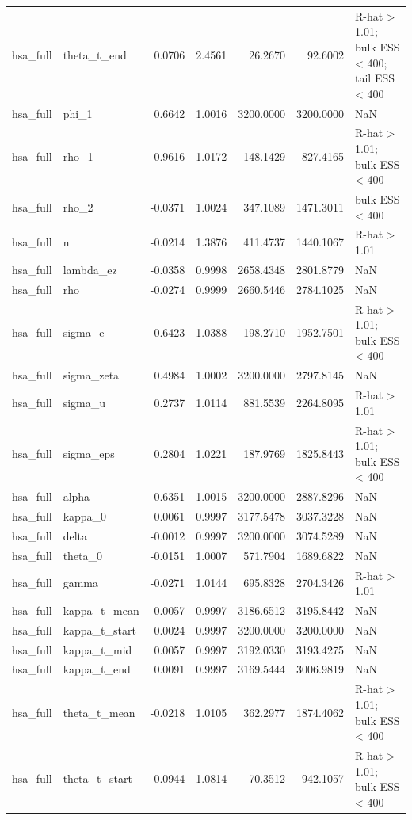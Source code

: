 \begin{tabular}{llrrrrl}
hsa\_full & theta\_t\_end & 0.0706 & 2.4561 & 26.2670 & 92.6002 & R-hat > 1.01; bulk ESS < 400; tail ESS < 400 \\
hsa\_full & phi\_1 & 0.6642 & 1.0016 & 3200.0000 & 3200.0000 & NaN \\
hsa\_full & rho\_1 & 0.9616 & 1.0172 & 148.1429 & 827.4165 & R-hat > 1.01; bulk ESS < 400 \\
hsa\_full & rho\_2 & -0.0371 & 1.0024 & 347.1089 & 1471.3011 & bulk ESS < 400 \\
hsa\_full & n & -0.0214 & 1.3876 & 411.4737 & 1440.1067 & R-hat > 1.01 \\
hsa\_full & lambda\_ez & -0.0358 & 0.9998 & 2658.4348 & 2801.8779 & NaN \\
hsa\_full & rho & -0.0274 & 0.9999 & 2660.5446 & 2784.1025 & NaN \\
hsa\_full & sigma\_e & 0.6423 & 1.0388 & 198.2710 & 1952.7501 & R-hat > 1.01; bulk ESS < 400 \\
hsa\_full & sigma\_zeta & 0.4984 & 1.0002 & 3200.0000 & 2797.8145 & NaN \\
hsa\_full & sigma\_u & 0.2737 & 1.0114 & 881.5539 & 2264.8095 & R-hat > 1.01 \\
hsa\_full & sigma\_eps & 0.2804 & 1.0221 & 187.9769 & 1825.8443 & R-hat > 1.01; bulk ESS < 400 \\
hsa\_full & alpha & 0.6351 & 1.0015 & 3200.0000 & 2887.8296 & NaN \\
hsa\_full & kappa\_0 & 0.0061 & 0.9997 & 3177.5478 & 3037.3228 & NaN \\
hsa\_full & delta & -0.0012 & 0.9997 & 3200.0000 & 3074.5289 & NaN \\
hsa\_full & theta\_0 & -0.0151 & 1.0007 & 571.7904 & 1689.6822 & NaN \\
hsa\_full & gamma & -0.0271 & 1.0144 & 695.8328 & 2704.3426 & R-hat > 1.01 \\
hsa\_full & kappa\_t\_mean & 0.0057 & 0.9997 & 3186.6512 & 3195.8442 & NaN \\
hsa\_full & kappa\_t\_start & 0.0024 & 0.9997 & 3200.0000 & 3200.0000 & NaN \\
hsa\_full & kappa\_t\_mid & 0.0057 & 0.9997 & 3192.0330 & 3193.4275 & NaN \\
hsa\_full & kappa\_t\_end & 0.0091 & 0.9997 & 3169.5444 & 3006.9819 & NaN \\
hsa\_full & theta\_t\_mean & -0.0218 & 1.0105 & 362.2977 & 1874.4062 & R-hat > 1.01; bulk ESS < 400 \\
hsa\_full & theta\_t\_start & -0.0944 & 1.0814 & 70.3512 & 942.1057 & R-hat > 1.01; bulk ESS < 400 \\

\end{tabular}

